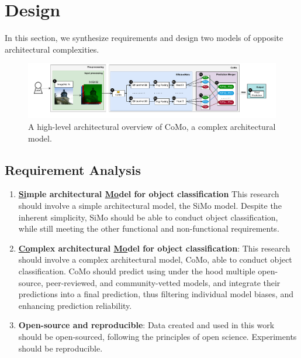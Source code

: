 

\section{Design} \label{sec:design} 


In this section, we synthesize requirements and design two models of opposite architectural complexities.



\begin{figure}
    \centering
    \includegraphics[width=0.95\linewidth]{figures/design-como.pdf}
    \caption{A high-level architectural overview of CoMo, a complex architectural model.}
    \label{fig:design:como}
\end{figure}

\subsection{Requirement Analysis} \label{sec:m3sa:requirements-analysis}
\begin{enumerate}[label=\textbf{(FR\arabic*)}, leftmargin=0pt, itemindent=3em]
    \item \label{fr1} \textbf{\underline{Si}mple architectural \underline{Mo}del for object classification} This research should involve a simple architectural model, the SiMo model. Despite the inherent simplicity, SiMo should be able to conduct object classification, while still meeting the other functional and non-functional requirements.
    
    \item \label{fr2} \textbf{\underline{Co}mplex architectural \underline{Mo}del for object classification}: 
    This research should involve a complex architectural model, CoMo, able to conduct object classification. CoMo should predict using under the hood multiple open-source, peer-reviewed, and community-vetted models, and integrate their predictions into a final prediction, thus filtering individual model biases, and enhancing prediction reliability.    

    \item \label{fr3} \textbf{Open-source and reproducible}: 
    Data created and used in this work should be open-sourced, following the principles of open science. Experiments should be reproducible.
\end{enumerate}


